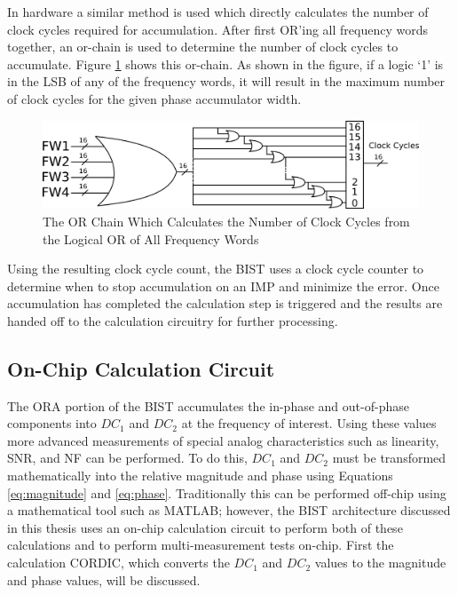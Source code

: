 \documentclass[12pt]{report}
\begin{document}
In hardware a similar method is used which directly calculates the number of clock cycles required for accumulation.  After first OR'ing all frequency words together, an or-chain is used to determine the number of clock cycles to accumulate.  Figure \ref{fig:or-chain} shows this or-chain.  As shown in the figure, if a logic `1' is in the LSB of any of the frequency words, it will result in the maximum number of clock cycles for the given phase accumulator width.  
\begin{figure}
	\begin{center}
		\includegraphics[scale=1.3]{images/or-chain}
	\end{center}
	\caption{The OR Chain Which Calculates the Number of Clock Cycles from the Logical OR of All Frequency Words}
	\label{fig:or-chain}
\end{figure}
Using the resulting clock cycle count, the BIST uses a clock cycle counter to determine when to stop accumulation on an IMP and minimize the error.  Once accumulation has completed the calculation step is triggered and the results are handed off to the calculation circuitry for further processing.

\subsection{On-Chip Calculation Circuit}
\label{sct:onchip}
The ORA portion of the BIST accumulates the in-phase and out-of-phase components into $DC_1$ and $DC_2$ at the frequency of interest.  Using these values more advanced measurements of special analog characteristics such as linearity, SNR, and NF can be performed.  To do this, $DC_1$ and $DC_2$ must be transformed mathematically into the relative magnitude and phase using Equations \ref{eq:magnitude} and \ref{eq:phase}\cite{joey}.  Traditionally this can be performed off-chip using a mathematical tool such as MATLAB; however, the BIST architecture discussed in this thesis uses an on-chip calculation circuit to perform both of these calculations and to perform multi-measurement tests on-chip\cite{joey}.  First the calculation CORDIC, which converts the $DC_1$ and $DC_2$ values to the magnitude and phase values, will be discussed.
\end{document}
